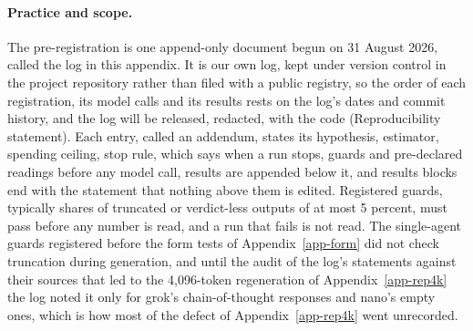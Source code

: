 \paragraph{Practice and scope.}
The pre-registration is one append-only document begun on 31 August 2026,
called the log in this appendix. It is our own log, kept under version
control in the project repository rather than filed with a public registry,
so the order of each registration, its model calls and its results rests on
the log's dates and commit history, and the log will be released, redacted,
with the code (Reproducibility statement).
Each entry, called an addendum, states its hypothesis, estimator, spending
ceiling, stop rule, which says when a run stops,
guards and pre-declared readings before any model call, results are appended
below it, and results blocks end with the statement that nothing above them
is edited. Registered guards, typically shares of truncated or verdict-less
outputs of at most 5 percent, must pass before any number is read, and a run
that fails is not read. The single-agent guards registered before the form tests of
Appendix~\ref{app-form} did not check truncation during generation, and until
the audit of the log's statements against their sources that led to the
4,096-token regeneration of Appendix~\ref{app-rep4k} the log noted it only for grok's chain-of-thought responses
and nano's empty ones, which is how most of the defect of
Appendix~\ref{app-rep4k} went unrecorded.

